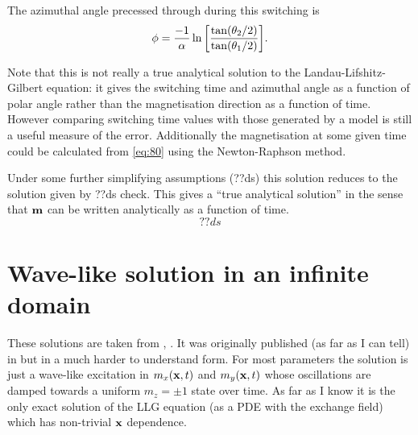 The azimuthal angle precessed through during this switching is
\begin{equation}
  \phi = \frac{-1}{\alpha} \ln {\left[  \frac{\tan(\theta_2/2)}{\tan(\theta_1/2)}  \right]}.
\end{equation}

Note that this is not really a true analytical solution to the Landau-Lifshitz-Gilbert equation:
it gives the switching time and azimuthal angle as a function of polar angle rather than the magnetisation direction as a function of time.
However comparing switching time values with those generated by a model is still a useful measure of the error.
Additionally the magnetisation at some given time could be calculated from \cref{eq:80} using \eg the Newton-Raphson method.

Under some further simplifying assumptions (??ds) this solution reduces to the solution given by \cite{Jiang2001} ??ds check.
This gives a ``true analytical solution'' in the sense that $\mathbf{m}$ can be written analytically as a function of time.
\begin{equation}
  ??ds
\end{equation}



\section{Wave-like solution in an infinite domain}
\label{sec:wave-like-solution}

These solutions are taken from \cite{Jeong2014}, \cite{Fuwa2006}.
It was originally published (as far as I can tell) in \cite{Lakshmanan1976} but in a much harder to understand form.
For most parameters the solution is just a wave-like excitation in $m_x(\mathbf{x}, t)$ and $m_y(\mathbf{x}, t)$ whose oscillations are damped towards a uniform $m_z = \pm 1$ state over time.
As far as I know it is the only exact solution of the LLG equation (as a PDE with the exchange field) which has non-trivial $\mathbf{x}$ dependence.

